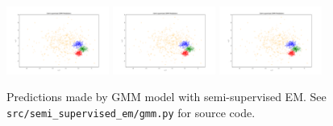 \begin{answer}
  \begin{figure}[H]
    \centering
    \includegraphics[width=0.3\textwidth]{../src/semi_supervised_em/pred_ss_0.pdf}
    \includegraphics[width=0.3\textwidth]{../src/semi_supervised_em/pred_ss_1.pdf}
    \includegraphics[width=0.3\textwidth]{../src/semi_supervised_em/pred_ss_2.pdf}
    \caption{Predictions made by GMM model with semi-supervised EM. See \texttt{src/semi\_supervised\_em/gmm.py} for source code.}
  \end{figure}
\end{answer}
